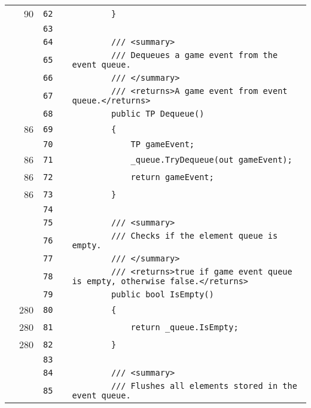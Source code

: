 \documentclass[a4paper,landscape,10pt]{article}
\begin{document}
\begin{longtable}[l]{lrrll}
\cellcolor{green} & 90 & \verb~62~ & & \verb~        }~\\
\cellcolor{gray} &  & \verb~63~ & & \verb~~\\
\cellcolor{gray} &  & \verb~64~ & & \verb~        /// <summary>~\\
\cellcolor{gray} &  & \verb~65~ & & \verb~        /// Dequeues a game event from the event queue.~\\
\cellcolor{gray} &  & \verb~66~ & & \verb~        /// </summary>~\\
\cellcolor{gray} &  & \verb~67~ & & \verb~        /// <returns>A game event from event queue.</returns>~\\
\cellcolor{gray} &  & \verb~68~ & & \verb~        public TP Dequeue()~\\
\cellcolor{green} & 86 & \verb~69~ & & \verb~        {~\\
\cellcolor{gray} &  & \verb~70~ & & \verb~            TP gameEvent;~\\
\cellcolor{green} & 86 & \verb~71~ & & \verb~            _queue.TryDequeue(out gameEvent);~\\
\cellcolor{green} & 86 & \verb~72~ & & \verb~            return gameEvent;~\\
\cellcolor{green} & 86 & \verb~73~ & & \verb~        }~\\
\cellcolor{gray} &  & \verb~74~ & & \verb~~\\
\cellcolor{gray} &  & \verb~75~ & & \verb~        /// <summary>~\\
\cellcolor{gray} &  & \verb~76~ & & \verb~        /// Checks if the element queue is empty.~\\
\cellcolor{gray} &  & \verb~77~ & & \verb~        /// </summary>~\\
\cellcolor{gray} &  & \verb~78~ & & \verb~        /// <returns>true if game event queue is empty, otherwise false.</returns>~\\
\cellcolor{gray} &  & \verb~79~ & & \verb~        public bool IsEmpty()~\\
\cellcolor{green} & 280 & \verb~80~ & & \verb~        {~\\
\cellcolor{green} & 280 & \verb~81~ & & \verb~            return _queue.IsEmpty;~\\
\cellcolor{green} & 280 & \verb~82~ & & \verb~        }~\\
\cellcolor{gray} &  & \verb~83~ & & \verb~~\\
\cellcolor{gray} &  & \verb~84~ & & \verb~        /// <summary>~\\
\cellcolor{gray} &  & \verb~85~ & & \verb~        /// Flushes all elements stored in the event queue.~\\

\end{longtable}
\end{document}
